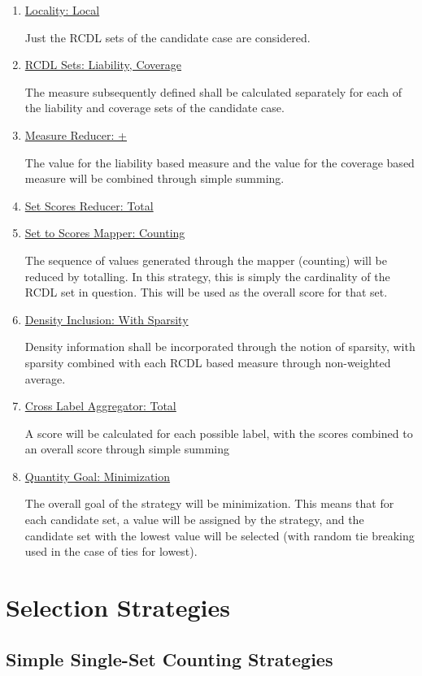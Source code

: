 \documentclass[a4paper,11pt]{report}
\begin{document}
\begin{enumerate}
	\item \underline{Locality: Local}
	
	Just the RCDL sets of the candidate case are considered.
	\item \underline{RCDL Sets: Liability, Coverage}
	
	The measure subsequently defined shall be calculated separately for each of the liability and coverage sets of the candidate case.
	\item \underline{Measure Reducer: +}
	
	The value for the liability based measure and the value for the coverage based measure will be 
	combined through simple summing.
	\item \underline{Set Scores Reducer: Total}
	\item \underline{Set to Scores Mapper: Counting}
	
	The sequence of values generated through the mapper (counting) will be reduced by totalling. In this strategy, this is simply the cardinality of the RCDL set in question. This will be used as the overall score for that set.	
	\item \underline{Density Inclusion: With Sparsity}
	
	Density information shall be incorporated through the notion of sparsity, with sparsity combined with each RCDL based measure through non-weighted average.
	\item \underline{Cross Label Aggregator: Total}
	
	A score will be calculated for each possible label, with the scores combined to an overall score through simple summing 
	\item \underline{Quantity Goal: Minimization}
	
	The overall goal of the strategy will be minimization. This means that for each candidate set, a value will be assigned by the strategy, and the candidate set with the lowest value will be selected (with random tie breaking used in the case of ties for lowest).
	
\end{enumerate}

\section{Selection Strategies}

\subsection{Simple Single-Set Counting Strategies}
\end{document}
